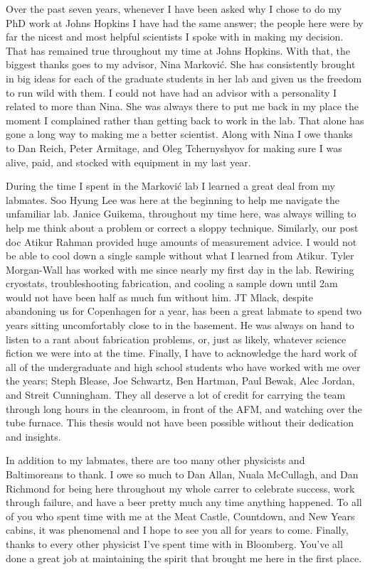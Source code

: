 \begin{frontmatter}
\begin{acknowledgment}
Over the past seven years, whenever I have been asked why I chose to do my PhD work at Johns Hopkins I have had the same answer; the people here were by far the nicest and most helpful scientists I spoke with in making my decision. That has remained true throughout my time at Johns Hopkins. With that, the biggest thanks goes to my advisor, Nina Markovi\'{c}. She has consistently brought in big ideas for each of the graduate students in her lab and given us the freedom to run wild with them. I could not have had an advisor with a personality I related to more than Nina. She was always there to put me back in my place the moment I complained rather than getting back to work in the lab. That alone has gone a long way to making me a better scientist. Along with Nina I owe thanks to Dan Reich, Peter Armitage, and Oleg Tchernyshyov for making sure I was alive, paid, and stocked with equipment in my last year.

During the time I spent in the Markovi\'{c} lab I learned a great deal from my labmates. Soo Hyung Lee was here at the beginning to help me navigate the unfamiliar lab. Janice Guikema, throughout my time here, was always willing to help me think about a problem or correct a sloppy technique. Similarly, our post doc Atikur Rahman provided huge amounts of measurement advice. I would not be able to cool down a single sample without what I learned from Atikur. Tyler Morgan-Wall has worked with me since nearly my first day in the lab. Rewiring cryostats, troubleshooting fabrication, and cooling a sample down until 2am would not have been half as much fun without him. JT Mlack, despite abandoning us for Copenhagen for a year, has been a great labmate to spend two years sitting uncomfortably close to in the basement. He was always on hand to listen to a rant about fabrication problems, or, just as likely, whatever science fiction we were into at the time. Finally, I have to acknowledge the hard work of all of the undergraduate and high school students who have worked with me over the years; Steph Blease, Joe Schwartz, Ben Hartman, Paul Bewak, Alec Jordan, and Streit Cunningham. They all deserve a lot of credit for carrying the team through long hours in the cleanroom, in front of the AFM, and watching over the tube furnace. This thesis would not have been possible without their dedication and insights.

In addition to my labmates, there are too many other physicists and Baltimoreans to thank. I owe so much to Dan Allan, Nuala McCullagh, and Dan Richmond for being here throughout my whole carrer to celebrate success, work through failure, and have a beer pretty much any time anything happened. To all of you who spent time with me at the Meat Castle, Countdown, and New Years cabins, it was phenomenal and I hope to see you all for years to come. Finally, thanks to every other physicist I've spent time with in Bloomberg. You've all done a great job at maintaining the spirit that brought me here in the first place.


\end{acknowledgment}
\end{frontmatter}
